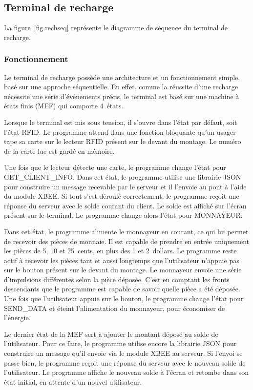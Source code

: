 	\subsection{Terminal de recharge}
	La figure~\ref{fig.rechseq} représente le diagramme de séquence du terminal de recharge.
		\subsubsection{Fonctionnement}
		Le terminal de recharge possède une architecture et un fonctionnement simple, basé sur une approche séquentielle. En effet, comme la réussite d’une recharge nécessite une série d'événements précis, le terminal est basé sur une machine à états finis (MEF) qui comporte 4~états. 

		Lorsque le terminal est mis sous tension, il s’ouvre dans l’état par défaut, soit l’état RFID. Le programme attend dans une fonction bloquante qu’un usager tape sa carte sur le lecteur RFID présent sur le devant du montage. Le numéro de la carte lue est gardé en mémoire.

		Une fois que le lecteur détecte une carte, le programme change l’état pour GET\_CLIENT\_INFO. Dans cet état, le programme utilise une librairie JSON pour construire un message recevable par le serveur et il l'envoie au pont à l’aide du module XBEE. Si tout s’est déroulé correctement, le programme reçoit une réponse du serveur avec le solde courant du client. Le solde est affiché sur l’écran présent sur le terminal. Le programme change alors l’état pour MONNAYEUR.

		Dans cet état, le programme alimente le monnayeur en courant, ce qui lui permet de recevoir des pièces de monnaie. Il est capable de prendre en entrée uniquement les pièces de 5, 10 et 25~cents, en plus des 1 et 2~dollars. Le programme reste actif à recevoir les pièces tant et aussi longtemps que l’utilisateur n’appuie pas sur le bouton présent sur le devant du montage. Le monnayeur envoie une série d’impulsions différentes selon la pièce déposée. C’est en comptant les fronts descendants que le programme est capable de savoir quelle pièce a été déposée. Une fois que l’utilisateur appuie sur le bouton, le programme change l’état pour SEND\_DATA et éteint l’alimentation du monnayeur, pour économiser de l’énergie. 

		Le dernier état de la MEF sert à ajouter le montant déposé au solde de l’utilisateur. Pour ce faire, le programme utilise encore la librairie JSON pour construire un message qu’il envoie via le module XBEE au serveur. Si l’envoi se passe bien, le programme reçoit une réponse du serveur avec le nouveau solde de l’utilisateur. Le programme affiche le nouveau solde à l’écran et retombe dans son état initial, en attente d’un nouvel utilisateur.
		
